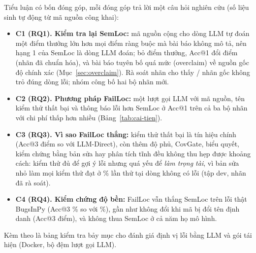 Tiểu luận có bốn đóng góp, mỗi đóng góp trả lời một câu hỏi nghiên cứu (số liệu sinh tự động từ mã nguồn công khai):
\begin{itemize}
\item \textbf{C1 (RQ1). Kiểm tra lại SemLoc:} mã nguồn cộng cho dòng LLM tự đoán một điểm thưởng lớn hơn mọi điểm ràng
buộc mà bài báo không mô tả, nên hạng 1 của SemLoc là dòng LLM đoán; bỏ điểm thưởng, Acc@1 đổi
\RqTwoRepairedAllSemlocNoPriorDAccOne{} điểm (nhãn đã chuẩn hóa), và bài báo tuyên bố quá mức (overclaim) về nguồn gốc độ
chính xác (Mục~\ref{sec:overclaim}). Rà soát nhãn cho thấy \LabaudAllMoved{}/\LabaudAllN{} nhãn gốc không trỏ đúng dòng
lỗi; nhóm công bố hai bộ nhãn mới.
\item \textbf{C2 (RQ2). Phương pháp FailLoc:} một lượt gọi LLM với mã nguồn, tên kiểm thử thất bại và thông báo lỗi hơn
SemLoc ở Acc@1 trên cả ba bộ nhãn với chi phí thấp hơn nhiều (Bảng~\ref{tab:cai-tien}).
\item \textbf{C3 (RQ3). Vì sao FailLoc thắng:} kiểm thử thất bại là tín hiệu chính (Acc@3
\AblRepairedAllTestsEffectDAccThree{} điểm so với LLM-Direct), còn thêm độ phủ, CovGate, biểu quyết, kiểm chứng bằng bản sửa
hay phân tích tĩnh đều không thu hẹp được khoảng cách: kiểm thử đủ để gợi ý lỗi nhưng quá yếu để \emph{làm trọng tài},
vì bản sửa nhỏ làm mọi kiểm thử đạt ở \PavmechReviewedOtherLineFixable\% lần thử tại dòng không có lỗi (tập dev, nhãn đã
rà soát).
\item \textbf{C4 (RQ4). Kiểm chứng độ bền:} FailLoc vẫn thắng SemLoc trên lỗi thật BugsInPy (Acc@3
\BipAllLlmTestsAccThreeMean\% so với \BipAllSemlocPriorAccThreeMean\%), gần như không đổi khi mã bị đổi tên định danh
(Acc@3 \RenRepairedLlmTestsDAccThree{} điểm), và không thua SemLoc ở cả năm họ mô hình.
\end{itemize}
Kèm theo là bảng kiểm tra bảy mục cho đánh giá định vị lỗi bằng LLM và gói tái hiện (Docker, bộ đệm lượt gọi LLM).

